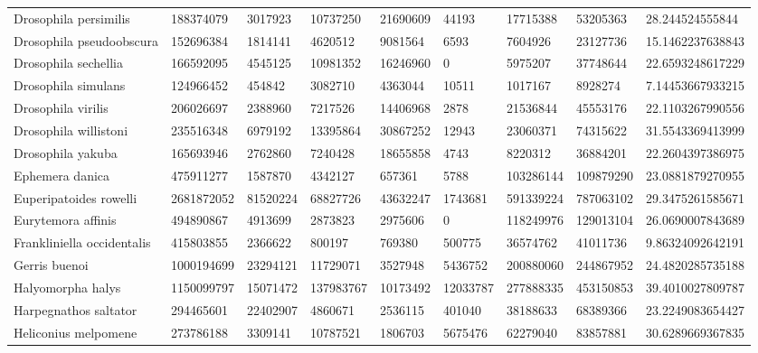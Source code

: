 \begin{table}[]
\begin{tabular}{@{}lllllllll@{}}
Drosophila persimilis      & 188374079   & 3017923   & 10737250  & 21690609  & 44193     & 17715388   & 53205363   & 28.244524555844   \\
Drosophila pseudoobscura   & 152696384   & 1814141   & 4620512   & 9081564   & 6593      & 7604926    & 23127736   & 15.1462237638843  \\
Drosophila sechellia       & 166592095   & 4545125   & 10981352  & 16246960  & 0         & 5975207    & 37748644   & 22.6593248617229  \\
Drosophila simulans        & 124966452   & 454842    & 3082710   & 4363044   & 10511     & 1017167    & 8928274    & 7.14453667933215  \\
Drosophila virilis         & 206026697   & 2388960   & 7217526   & 14406968  & 2878      & 21536844   & 45553176   & 22.1103267990556  \\
Drosophila willistoni      & 235516348   & 6979192   & 13395864  & 30867252  & 12943     & 23060371   & 74315622   & 31.5543369413999  \\
Drosophila yakuba          & 165693946   & 2762860   & 7240428   & 18655858  & 4743      & 8220312    & 36884201   & 22.2604397386975  \\
Ephemera danica            & 475911277   & 1587870   & 4342127   & 657361    & 5788      & 103286144  & 109879290  & 23.0881879270955  \\
Euperipatoides rowelli     & 2681872052  & 81520224  & 68827726  & 43632247  & 1743681   & 591339224  & 787063102  & 29.3475261585671  \\
Eurytemora affinis         & 494890867   & 4913699   & 2873823   & 2975606   & 0         & 118249976  & 129013104  & 26.0690007843689  \\
Frankliniella occidentalis & 415803855   & 2366622   & 800197    & 769380    & 500775    & 36574762   & 41011736   & 9.86324092642191  \\
Gerris buenoi              & 1000194699  & 23294121  & 11729071  & 3527948   & 5436752   & 200880060  & 244867952  & 24.4820285735188  \\
Halyomorpha halys          & 1150099797  & 15071472  & 137983767 & 10173492  & 12033787  & 277888335  & 453150853  & 39.4010027809787  \\
Harpegnathos saltator      & 294465601   & 22402907  & 4860671   & 2536115   & 401040    & 38188633   & 68389366   & 23.2249083654427  \\
Heliconius melpomene       & 273786188   & 3309141   & 10787521  & 1806703   & 5675476   & 62279040   & 83857881   & 30.6289669367835  \\

\end{tabular}
\end{table}
